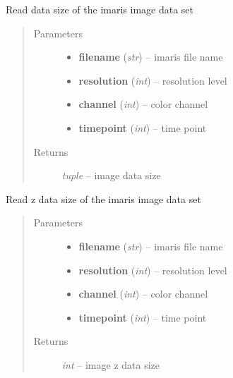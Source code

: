 \documentclass[letterpaper,10pt,english]{sphinxmanual}
\begin{document}

\begin{fulllineitems}
\label{api/ClearMap.IO:ClearMap.IO.Imaris.dataSize}
Read data size of the imaris image data set
\begin{quote}\begin{description}
\item[{Parameters}] \leavevmode\begin{itemize}
\item {} 
\textbf{filename} (\emph{str}) --
imaris file name

\item {} 
\textbf{resolution} (\emph{int}) --
resolution level

\item {} 
\textbf{channel} (\emph{int}) --
color channel

\item {} 
\textbf{timepoint} (\emph{int}) --
time point

\end{itemize}

\item[{Returns}] \leavevmode
\emph{tuple} --
image data size

\end{description}\end{quote}

\end{fulllineitems}


\begin{fulllineitems}
\label{api/ClearMap.IO:ClearMap.IO.Imaris.dataZSize}
Read z data size of the imaris image data set
\begin{quote}\begin{description}
\item[{Parameters}] \leavevmode\begin{itemize}
\item {} 
\textbf{filename} (\emph{str}) --
imaris file name

\item {} 
\textbf{resolution} (\emph{int}) --
resolution level

\item {} 
\textbf{channel} (\emph{int}) --
color channel

\item {} 
\textbf{timepoint} (\emph{int}) --
time point

\end{itemize}

\item[{Returns}] \leavevmode
\emph{int} --
image z data size

\end{description}\end{quote}

\end{fulllineitems}
\end{document}
